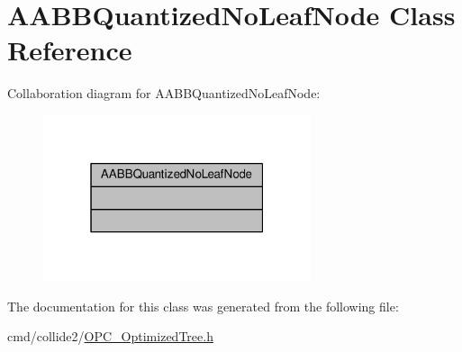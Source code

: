 \hypertarget{classAABBQuantizedNoLeafNode}{}\section{A\+A\+B\+B\+Quantized\+No\+Leaf\+Node Class Reference}
\label{classAABBQuantizedNoLeafNode}


Collaboration diagram for A\+A\+B\+B\+Quantized\+No\+Leaf\+Node\+:
\nopagebreak
\begin{figure}[H]
\begin{center}
\leavevmode
\includegraphics[width=223pt]{d9/d3e/classAABBQuantizedNoLeafNode__coll__graph}
\end{center}
\end{figure}


The documentation for this class was generated from the following file\+:\begin{DoxyCompactItemize}
\item 
cmd/collide2/\hyperlink{OPC__OptimizedTree_8h}{O\+P\+C\+\_\+\+Optimized\+Tree.\+h}\end{DoxyCompactItemize}
